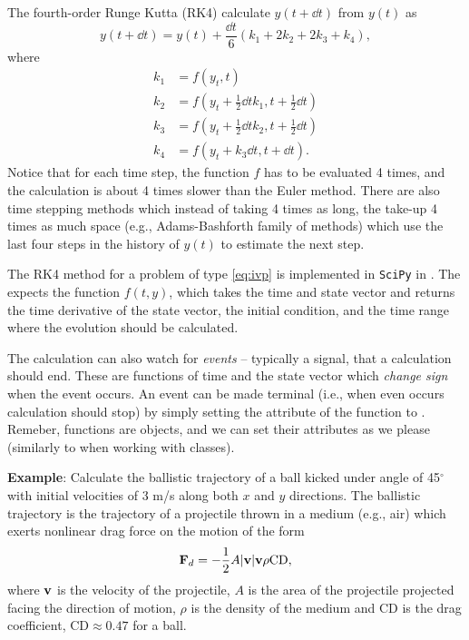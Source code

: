 The fourth-order Runge Kutta (RK4) calculate $y(t + \dd t)$ from $y(t)$ as
\begin{equation}
    \label{eq:RK4}
    y(t + \dd t) = y(t) + \frac{\dd t}{6}\left(k_1 + 2k_2 + 2k_3 + k_4\right),
\end{equation}
where
\begin{equation}
    \begin{aligned}
        k_1 &= f(y_t, t)\\
        k_2 &= f\left(y_t + \frac{1}{2}\dd t k_1, t + \frac{1}{2}\dd t\right)\\
        k_3 &= f\left(y_t + \frac{1}{2}\dd t k_2, t + \frac{1}{2}\dd t\right)\\
        k_4 &= f(y_t + k_3 \dd t, t + \dd t).
    \end{aligned}
\end{equation}
Notice that for each time step, the function $f$ has to be evaluated 4 times, and the calculation is about 4 times slower than the Euler method. There are also time stepping methods which instead of taking 4 times as long, the take-up 4 times as much space (e.g., Adams-Bashforth family of methods) which use the last four steps in the history of $y(t)$ to estimate the next step.

The RK4 method for a problem of type \eqref{eq:ivp} is implemented in \verb|SciPy| in . The  expects the function $f(t, y)$, which takes the time and state vector and returns the time derivative of the state vector, the initial condition, and the time range where the evolution should be calculated.

The calculation can also watch for \emph{events} -- typically a signal, that a calculation should end. These are functions of time and the state vector which \emph{change sign} when the event occurs. An event can be made terminal (i.e., when even occurs calculation should stop) by simply setting the  attribute of the function to . Remeber, functions are objects, and we can set their attributes as we please (similarly to  when working with classes).

\textbf{Example}: Calculate the ballistic trajectory of a ball kicked under angle of 45$^\circ$ with initial velocities of 3 m/s along both $x$ and $y$ directions. The ballistic trajectory is the trajectory of a projectile thrown in a medium (e.g., air) which exerts nonlinear drag force on the motion of the form
\begin{equation}
    \mathbf{F}_d = -\frac{1}{2}A|\mathbf{v}|\mathbf{v} \rho \mathrm{CD},
\end{equation}
where $\mathbf{v}$ is the velocity of the projectile, $A$ is the area of the projectile projected facing the direction of motion, $\rho$ is the density of the medium and CD is the drag coefficient, $\mathrm{CD}\approx0.47$ for a ball.

